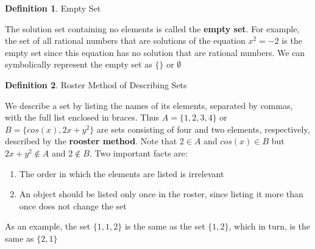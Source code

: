 \documentclass{book}
\theoremstyle{definition}
\newtheorem{definition}{Definition}[section]
\theoremstyle{remark}
\begin{document}
\begin{definition}
Empty Set \\
\begin{tcolorbox}
    The solution set containing no elements is called the {\bf empty set}. For example, the set of all rational numbers that are solutions of the equation $x^2=-2$ is the empty set since this equation has no solution that are rational numbers. We can symbolically represent the empty set as $\{ \}$ or $\emptyset$ \\
\end{tcolorbox}
\end{definition}

\begin{definition}
Roster Method of Describing Sets \\

    \begin{tcolorbox}
        We describe a set by listing the names of its elements, separated by commas, with the full list enclosed in braces. Thus $A = \{1,2,3,4\}$ or $B = \{cos(x), 2x+y^2 \}$ are sets consisting of four and two elements, respectively, described by the \textbf{rooster method}. Note that $2 \in A$ and $cos(x) \in B$ but $2x+y^2 \notin A$ and $2 \notin B$. Two important facts are:
        \begin{enumerate}
            \item The order in which the elements are listed is irrelevant
            \item An object should be listed only once in the roster, since listing it more than once does not change the set
        \end{enumerate}
    
        As an example, the set $\{1,1,2\}$ is the same as the set $\{1,2\}$, which in turn, is the same as $\{2,1\}$
    \end{tcolorbox}

\end{definition}
\end{document}
